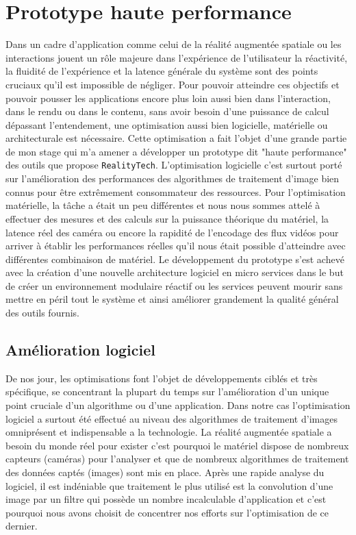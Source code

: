 \chapter{Prototype haute performance}
\label{chap:protoHP}

Dans un cadre d'application comme celui de la réalité augmentée spatiale ou les interactions jouent un rôle majeure dans l'expérience de l'utilisateur la réactivité, la fluidité de l'expérience et la latence générale du système sont des points cruciaux qu'il est impossible de négliger. Pour pouvoir atteindre ces objectifs et pouvoir pousser les applications encore plus loin aussi bien dans l'interaction, dans le rendu ou dans le contenu, sans avoir besoin d'une puissance de calcul dépassant l'entendement, une optimisation aussi bien logicielle, matérielle ou architecturale est nécessaire. Cette optimisation a fait l'objet d'une grande partie de mon stage qui m'a amener a développer un prototype dit "haute performance" des outils que propose \texttt{RealityTech}. L'optimisation logicielle c'est surtout porté sur l'amélioration des performances des algorithmes de traitement d'image bien connus pour être extrêmement consommateur des ressources. Pour l'optimisation matérielle, la tâche a était un peu différentes et nous nous sommes attelé à effectuer des mesures et des calculs sur la puissance théorique du matériel, la latence réel des caméra ou encore la rapidité de l'encodage des flux vidéos pour arriver à établir les performances réelles qu'il nous était possible d'atteindre avec différentes combinaison de matériel. Le développement du prototype s'est achevé avec la création d'une nouvelle architecture logiciel en micro services dans le but de créer un environnement modulaire réactif ou les services peuvent mourir sans mettre en péril tout le système et ainsi améliorer grandement la qualité général des outils fournis.

\section{Amélioration logiciel}
De nos jour, les optimisations font l'objet de développements ciblés et très spécifique, se concentrant la plupart du temps sur l'amélioration d'un unique point cruciale d'un algorithme ou d'une application. Dans notre cas l'optimisation logiciel a surtout été effectué au niveau des algorithmes de traitement d'images omniprésent et indispensable a la technologie. La réalité augmentée spatiale a besoin du monde réel pour exister c'est pourquoi le matériel dispose de nombreux capteurs (caméras) pour l'analyser et que de nombreux algorithmes de traitement des données captés (images) sont mis en place. Après une rapide analyse du logiciel, il est indéniable que traitement le plus utilisé est la convolution d'une image par un filtre qui possède un nombre incalculable d'application et c'est pourquoi nous avons choisit de concentrer nos efforts sur l'optimisation de ce dernier.

